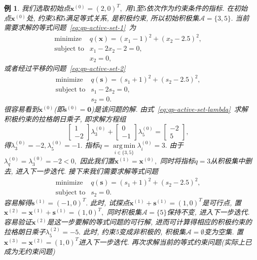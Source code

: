 \documentclass{SBCbookchapter}
\newcommand{\V}[1]{{\bm{#1}}}
\DeclareMathOperator*{\argmin}{arg\,min}
\newtheorem{eg}[thm]{例}
\numberwithin{equation}{section}
\begin{document}
\begin{eg}
我们选取初始点$\V{x}^{(0)} = (2, 0)^T,$ 用$1$至$5$依次作为约束条件的指标. 在初始点$\V{x}^{(0)}$处, 约束$3$和$5$满足等式关系, 是积极约束, 所以初始积极集$\mathcal{A} = \{ 3, 5 \}.$ 当前需要求解的等式问题~\eqref{eq:qp-active-set-1}~为
\begin{equation*}
\begin{array}{cl}
\text{minimize} & q(\V{x}) = (x_1 - 1)^2 + (x_2 - 2.5)^2, \\
\text{subject to} & x_1 - 2x_2 - 2 = 0, \\
& x_2 = 0,
\end{array}
\end{equation*}
或者经过平移的问题~\eqref{eq:qp-active-set-2}
\begin{equation*}
\begin{array}{cl}
\text{minimize} & q(\V{s}) = (s_1 + 1)^2 + (s_2 - 2.5)^2, \\
\text{subject to} & s_1 - 2s_2 = 0, \\
& s_2 = 0.
\end{array}
\end{equation*}
很容易看到$\V{x}^{(0)}$(即$\V{s}^{(0)} = \V{0}$)是该问题的解. 由式~\eqref{eq:qp-active-set-lambda}~求解积极约束的拉格朗日乘子, 即求解方程组
\begin{equation*}
\begin{bmatrix} 1 \\ -2 \end{bmatrix} \lambda_3^{(0)} + \begin{bmatrix} 0 \\ -1 \end{bmatrix} \lambda_5^{(0)} = \begin{bmatrix} -2 \\ 5 \end{bmatrix},
\end{equation*}
得$\lambda_3^{(0)} = -2, \lambda_5^{(0)} = -1.$ 指标$q = \argmin\limits_{i \in \{ 3, 5 \}} \lambda_i^{(0)} = 3.$ 由于$\lambda_q^{(0)} = \lambda_3^{(0)} = -2 < 0,$ 因此我们置$\V{x}^{(1)} = \V{x}^{(0)},$ 同时将指标$q = 3$从积极集中删去, 进入下一步迭代. 接下来我们需要求解等式问题
\begin{equation*}
\begin{array}{cl}
\text{minimize} & q(\V{s}) = (s_1 + 1)^2 + (s_2 - 2.5)^2, \\
\text{subject to} & s_2 = 0.
\end{array}
\end{equation*}
容易解得$\V{s}^{(1)} = (-1, 0)^T.$ 此时, 试探点$\V{x}^{(1)} + \V{s}^{(1)} = (1, 0)^T$是可行点, 置$\V{x}^{(2)} = \V{x}^{(1)} + \V{s}^{(1)} = (1, 0)^T,$ 同时积极集$\mathcal{A} = \{ 5 \}$保持不变, 进入下一步迭代. 容易验证$\V{x}^{(2)}$是这一步要解的等式问题的可行解, 进而可计算得相应的积极约束的拉格朗日乘子$\lambda_5^{(2)} = -5.$ 此时, 约束5变成非积极的, 积极集$\mathcal{A} = \emptyset$变为空集. 置$\V{x}^{(3)} = \V{x}^{(2)} = (1, 0)^T$进入下一步迭代. 再次求解当前的等式约束问题(实际上已成为无约束问题)

\end{eg}
\end{document}
